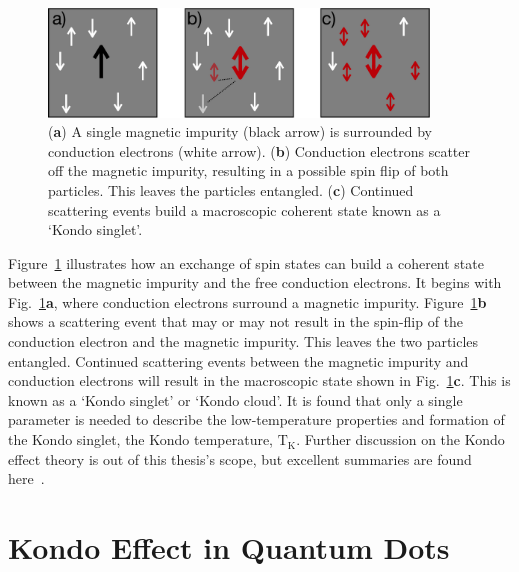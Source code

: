 \begin{figure}[!hbt]
 \begin{center}
\includegraphics[width=0.9\textwidth]{figures/ch2/figure10.pdf}
\caption[Kondo Effect Illustration : Bulk Material]{\label{fig:ch2/kondo_bulkdiagram} 
(\textbf{a}) A single magnetic impurity (black arrow) is surrounded by conduction electrons (white arrow). (\textbf{b}) Conduction electrons scatter off the magnetic impurity, resulting in a possible spin flip of both particles. This leaves the particles entangled. (\textbf{c}) Continued scattering events build a macroscopic coherent state known as a `Kondo singlet'.
 }
 \end{center}
\end{figure}


Figure~\ref{fig:ch2/kondo_bulkdiagram} illustrates how an exchange of spin states can build a coherent state between the magnetic impurity and the free conduction electrons. It begins with Fig.~\ref{fig:ch2/kondo_bulkdiagram}\textbf{a}, where conduction electrons surround a magnetic impurity. 
Figure~\ref{fig:ch2/kondo_bulkdiagram}\textbf{b} shows a scattering event that may or may not result in the spin-flip of the conduction electron and the magnetic impurity. This leaves the two particles entangled. Continued scattering events between the magnetic impurity and conduction electrons will result in the macroscopic state shown in Fig.~\ref{fig:ch2/kondo_bulkdiagram}\textbf{c}. This is known as a `Kondo singlet' or `Kondo cloud'. It is found that only a single parameter is needed to describe the low-temperature properties and formation of the Kondo singlet, the Kondo temperature, $\mathrm{T_K}$. Further discussion on the Kondo effect theory is out of this thesis's scope, but excellent summaries are found here~\cite{kondo_review, Mahan2000, kondo_theory_history}. 




\afterpage{\clearpage}
\section{Kondo Effect in Quantum Dots}

